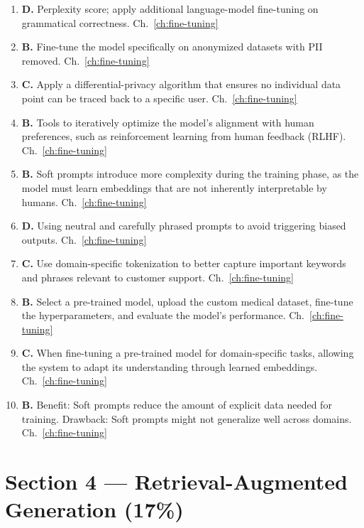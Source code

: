 \begin{enumerate}[resume,leftmargin=*]
  \item \textbf{D.} Perplexity score; apply additional language-model fine-tuning on grammatical correctness. \hfill Ch.~\ref{ch:fine-tuning}
  \item \textbf{B.} Fine-tune the model specifically on anonymized datasets with PII removed. \hfill Ch.~\ref{ch:fine-tuning}
  \item \textbf{C.} Apply a differential-privacy algorithm that ensures no individual data point can be traced back to a specific user. \hfill Ch.~\ref{ch:fine-tuning}
  \item \textbf{B.} Tools to iteratively optimize the model's alignment with human preferences, such as reinforcement learning from human feedback (RLHF). \hfill Ch.~\ref{ch:fine-tuning}
  \item \textbf{B.} Soft prompts introduce more complexity during the training phase, as the model must learn embeddings that are not inherently interpretable by humans. \hfill Ch.~\ref{ch:fine-tuning}
  \item \textbf{D.} Using neutral and carefully phrased prompts to avoid triggering biased outputs. \hfill Ch.~\ref{ch:fine-tuning}
  \item \textbf{C.} Use domain-specific tokenization to better capture important keywords and phrases relevant to customer support. \hfill Ch.~\ref{ch:fine-tuning}
  \item \textbf{B.} Select a pre-trained model, upload the custom medical dataset, fine-tune the hyperparameters, and evaluate the model's performance. \hfill Ch.~\ref{ch:fine-tuning}
  \item \textbf{C.} When fine-tuning a pre-trained model for domain-specific tasks, allowing the system to adapt its understanding through learned embeddings. \hfill Ch.~\ref{ch:fine-tuning}
  \item \textbf{B.} Benefit: Soft prompts reduce the amount of explicit data needed for training. Drawback: Soft prompts might not generalize well across domains. \hfill Ch.~\ref{ch:fine-tuning}
\end{enumerate}

\section*{Section 4 --- Retrieval-Augmented Generation (17\%)}

